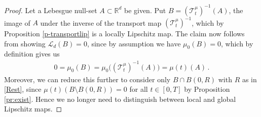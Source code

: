\documentclass[A4paper,11pt]{article}
\theoremstyle{definition}
\newcommand{\R}{\mathbb{R}}
\newcommand{\cl}{\mathcal{L}}
\newcommand{\ct}{\mathcal{T}}
\begin{document}
\begin{proof}
%	
%	

	Let a Lebesgue null-set $A\subset\R^d$ be given. Put $B=(\ct^\mu_t)^{-1}(A)$,
	the image of $A$ under the inverse of the transport map $(\ct^\mu_t)^{-1}$, which by Proposition \ref{p-transportlip} is a locally Lipschitz map. The claim now follows from showing $\cl_d(B)=0$,
	since by assumption we have $\mu_0(B)=0$, which by definition gives us
	\begin{align*}
		0=\mu_0(B)=\mu_0\bigl((\ct^\mu_t)^{-1}(A)\bigr) = \mu(t)(A)\,.
	\end{align*}
	Moreover, we can reduce this further to consider only $B\cap B(0,R)$ with $R$ as in
	\eqref{Rest}, since $\mu(t)(B\setminus B(0,R))=0$ for all $t \in [0,T]$ by Proposition \ref{pr:exist}. Hence we no longer need to distinguish
	between local and global Lipschitz maps.
	

\end{proof}
\end{document}
